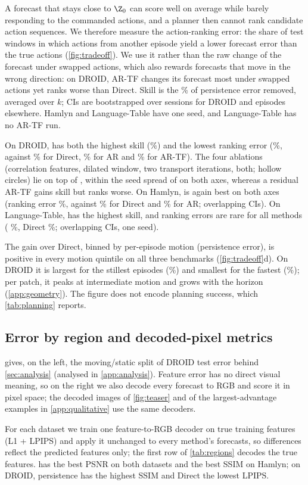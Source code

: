 A forecast that stays close to $\Z_0$ can score
well on average while barely responding to the commanded actions, and a planner then cannot rank
candidate action sequences. We therefore measure the action-ranking error: the share of test windows in which actions
from another episode yield a lower forecast error than the true actions (\cref{fig:tradeoff}). We use it rather than
the raw change of the forecast under swapped actions, which also rewards forecasts that move in the wrong direction: on
DROID, AR-TF changes its forecast most under swapped actions yet ranks worse than Direct. Skill is the \% of
persistence error removed, averaged over $k$; CIs are bootstrapped over sessions for DROID and episodes elsewhere.
Hamlyn and Language-Table have one seed, and Language-Table has no AR-TF run.

On DROID, \ours{} has both the
highest skill (\toDroidSkillShift\%) and the lowest ranking error (\toDroidErrShift\%, against \toDroidErrDirect\% for
Direct, \toDroidErrAR\% for AR and \toDroidErrARTF\% for AR-TF). The four \ours{} ablations (correlation features,
dilated window, two transport iterations, both; hollow circles) lie on top of \ours{}, within the seed spread of \ours{} on both axes, whereas a residual
AR-TF gains skill but ranks worse. On Hamlyn, \ours{} is again best on both axes (ranking error \toHamErrShift\%,
against \toHamErrDirect\% for Direct and \toHamErrAR\% for AR; overlapping CIs). On Language-Table, \ours{} has the
highest skill, and ranking errors are rare for all methods (\ours{} \toLTErrShift\%, Direct \toLTErrDirect\%;
overlapping CIs, one seed).

The gain over Direct, binned by per-episode motion (persistence error), is positive in every motion quintile on all three benchmarks
(\cref{fig:tradeoff}d). On DROID it is largest for the stillest episodes (\toDroidGainStill\%) and smallest for the
fastest (\toDroidGainFast\%); per patch, it peaks at intermediate motion and grows with the horizon
(\cref{app:geometry}). The figure
does not encode planning success, which \cref{tab:planning} reports.

\FloatBarrier
\subsection{Error by region and decoded-pixel metrics}\label{app:pixel}
 gives, on the left, the moving/static split of DROID test error behind \cref{sec:analysis}
(analysed in \cref{app:analysis}). Feature error has no direct visual meaning, so on the right we also decode every
forecast to RGB and score it in pixel space; the decoded images of \cref{fig:teaser} and of the largest-advantage
examples in \cref{app:qualitative} use the same decoders.

For each dataset we train one feature-to-RGB decoder on true training features (L1 + LPIPS) and apply it
unchanged to every method's forecasts, so differences reflect the predicted features only; the first row of
\cref{tab:regions} decodes the true features. \ours{} has the best PSNR on both datasets and the best SSIM on Hamlyn;
on DROID, persistence has the highest SSIM and Direct the lowest LPIPS.

